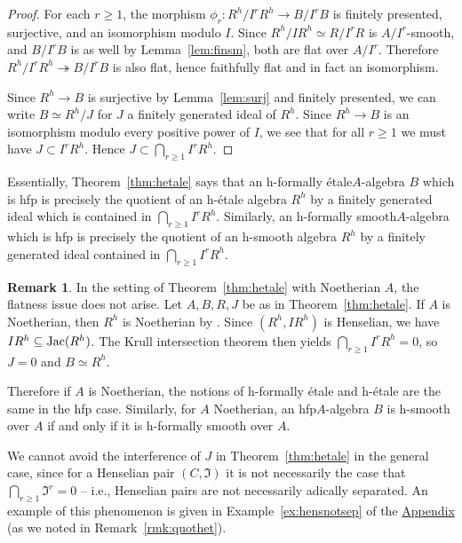 \documentclass[12pt]{article}
\newcommand{\Jac}{{\rm Jac}}
\newcommand{\mf}[1]{\mathfrak{#1}}
\newcommand{\hfp}{hfp\xspace}
\newcommand{\hetale}{h-\'etale\xspace}
\newcommand{\hfetale}{h-formally \'etale\xspace}
\newcommand{\hsmooth}{h-smooth\xspace}
\newcommand{\hfsmooth}{h-formally smooth\xspace}
\newcommand{\spcite}[2]{\cite[\href{https://stacks.math.columbia.edu/tag/#1}{{#2} {#1}}]{stackp}}
\theoremstyle{definition}
\newtheorem{remark}[theorem]{Remark}
\numberwithin{equation}{subsection}
\begin{document}
\begin{proof}
For each $r \ge 1$, the morphism $\phi_r: R^h/I^rR^h \to B/I^rB$ is finitely presented, surjective, and an isomorphism modulo $I$. Since $R^h/IR^h\simeq R/I^rR$ is $A/I^r$-smooth, and $B/I^rB$ is as well by Lemma~\ref{lem:finsm}, both are flat over $A/I^r$. Therefore $R^h/I^rR^h \twoheadrightarrow B/I^rB$ is also flat, hence faithfully flat and in fact an isomorphism.

Since $R^h \to B$ is surjective by Lemma~\ref{lem:surj} and finitely presented, we can write $B \simeq R^h/J$ for $J$ a finitely generated ideal of $R^h$. Since $R^h \to B$ is an isomorphism modulo every positive power of $I$, we see that  for all $r \ge 1$ we must have $J \subset I^rR^h$. Hence $J \subset \bigcap_{r \ge 1} I^rR^h$.\end{proof}







Essentially, Theorem~\ref{thm:hetale} says that an \hfetale $A$-algebra $B$ which is \hfp is precisely the quotient of an \hetale algebra $R^h$ by a finitely generated ideal which is contained in $\bigcap_{r \ge 1} I^rR^h$. Similarly, an \hfsmooth $A$-algebra which is \hfp is precisely the quotient of an \hsmooth algebra $R^h$ by a finitely generated ideal contained in $\bigcap_{r \ge 1} I^rR^h$.

\begin{remark}\label{rmk:noethhetale} In the setting of Theorem~\ref{thm:hetale} with Noetherian $A$, the flatness issue does not arise. Let $A,B,R,J$ be as in Theorem~\ref{thm:hetale}. If $A$ is Noetherian, then $R^h$ is Noetherian by \spcite{0AGV}{Lemma}. Since $(R^h,IR^h)$ is Henselian, we have $IR^h \subseteq \Jac(R^h)$. The Krull intersection theorem then yields $\bigcap_{r \ge 1} I^rR^h = 0$, so $J=0$ and $B \simeq R^h$. 

Therefore if $A$ is Noetherian, the notions of \hfetale and \hetale are the same in the \hfp case. Similarly, for $A$ Noetherian, an \hfp $A$-algebra $B$ is \hsmooth over $A$ if and only if it is \hfsmooth over $A$. \end{remark}

We cannot avoid the interference of $J$ in Theorem~\ref{thm:hetale} in the general case, since for a Henselian pair $(C,\mf{I})$ it is not necessarily the case that $\bigcap_{r \ge 1} \mf{I}^r = 0$ -- i.e., Henselian pairs are not necessarily adically separated. An example of this phenomenon is given in Example~\ref{ex:hensnotsep} of the \hyperref[sec:appendix]{Appendix} (as we noted in Remark~\ref{rmk:quothet}). 
\end{document}
